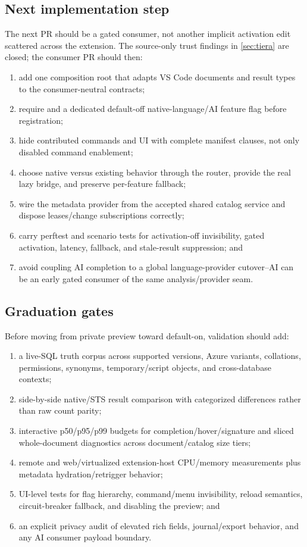 \documentclass[11pt]{article}
\newcommand{\code}[1]{\texttt{\detokenize{#1}}}
\begin{document}
\subsection{Next implementation step}

The next PR should be a gated consumer, not another implicit activation edit scattered across the extension. The source-only trust findings in \cref{sec:tiera} are closed; the consumer PR should then:

\begin{enumerate}
  \item add one composition root that adapts VS Code documents and result types to the consumer-neutral contracts;
  \item require \code{mssql.enableExperimentalFeatures} and a dedicated default-off native-language/AI feature flag before registration;
  \item hide contributed commands and UI with complete manifest \code{when} clauses, not only disabled command enablement;
  \item choose native versus existing behavior through the router, provide the real lazy bridge, and preserve per-feature fallback;
  \item wire the metadata provider from the accepted shared catalog service and dispose leases/change subscriptions correctly;
  \item carry perftest and scenario tests for activation-off invisibility, gated activation, latency, fallback, and stale-result suppression; and
  \item avoid coupling AI completion to a global language-provider cutover--AI can be an early gated consumer of the same analysis/provider seam.
\end{enumerate}

\subsection{Graduation gates}

Before moving from private preview toward default-on, validation should add:

\begin{enumerate}
  \item a live-SQL truth corpus across supported versions, Azure variants, collations, permissions, synonyms, temporary/script objects, and cross-database contexts;
  \item side-by-side native/STS result comparison with categorized differences rather than raw count parity;
  \item interactive p50/p95/p99 budgets for completion/hover/signature and sliced whole-document diagnostics across document/catalog size tiers;
  \item remote and web/virtualized extension-host CPU/memory measurements plus metadata hydration/retrigger behavior;
  \item UI-level tests for flag hierarchy, command/menu invisibility, reload semantics, circuit-breaker fallback, and disabling the preview; and
  \item an explicit privacy audit of elevated rich fields, journal/export behavior, and any AI consumer payload boundary.
\end{enumerate}
\end{document}
